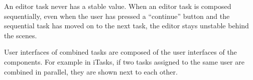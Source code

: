 An editor task never has a stable value. When an editor task is composed sequentially, even when the user has pressed a ``continue'' button and the sequential task has moved on to the next task, the editor stays unstable behind the scenes.

User interfaces of combined tasks are composed of the user interfaces of the components. For example in iTasks, if two tasks assigned to the same user are combined in parallel, they are shown next to each other. \cite[\S 4.2.4]{naus2020assisting}
